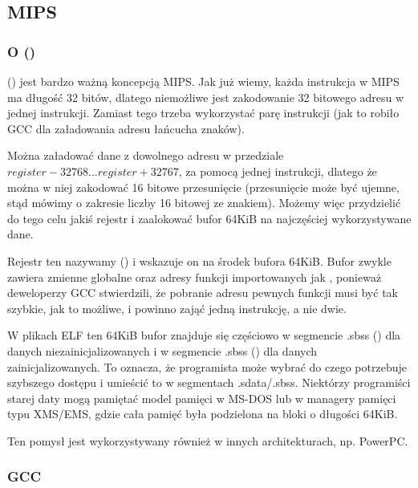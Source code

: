 \subsection{MIPS}

\subsubsection{O  ()}
\label{MIPS_GP}

 () jest bardzo ważną koncepcją MIPS.
Jak już wiemy, każda instrukcja w MIPS ma długość 32 bitów, dlatego niemożliwe jest  zakodowanie 32 bitowego adresu w jednej instrukcji. Zamiast tego trzeba wykorzystać parę instrukcji
(jak to robiło GCC dla załadowania adresu łańcucha znaków).

Można załadować dane z dowolnego adresu w przedziale $register-32768...register+32767$, za pomocą jednej instrukcji, dlatego że można w niej zakodować 16 bitowe
przesunięcie (przesunięcie może być ujemne, stąd mówimy o zakresie liczby 16 bitowej ze znakiem).
Możemy więc przydzielić do tego celu jakiś rejestr i zaalokować bufor 64KiB na najczęściej wykorzystywane dane.

Rejestr ten nazywamy  () i wskazuje on na środek bufora 64KiB.
Bufor zwykle zawiera zmienne globalne oraz adresy funkcji importowanych jak \printf, ponieważ deweloperzy GCC stwierdzili, że pobranie adresu pewnych funkcji musi być tak szybkie, jak to możliwe, i powinno zająć jedną instrukcję, a nie dwie.

W plikach ELF ten 64KiB bufor znajduje się częściowo w segmencie .sbss () dla danych niezainicjalizowanych i w segmencie .sbss () dla danych zainicjalizowanych.
To oznacza, że programista może wybrać do czego potrzebuje szybszego dostępu i umieścić to
w segmentach .sdata/.sbss.
Niektórzy programiści starej daty mogą pamiętać model pamięci w MS-DOS 
lub w managery pamięci typu XMS/EMS, gdzie cała pamięć była podzielona na bloki o długości 64KiB.

Ten pomysł jest wykorzystywany również w innych architekturach, np. PowerPC.

\subsubsection{\Optimizing GCC}

